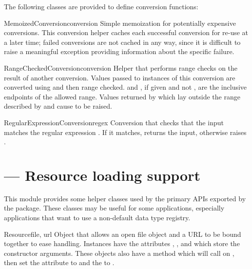 \documentclass{howto}
\begin{document}
The following classes are provided to define conversion functions:

\begin{classdesc}{MemoizedConversion}{conversion}
  Simple memoization for potentially expensive conversions.  This
  conversion helper caches each successful conversion for re-use at a
  later time; failed conversions are not cached in any way, since it
  is difficult to raise a meaningful exception providing information
  about the specific failure.
\end{classdesc}

\begin{classdesc}{RangeCheckedConversion}{conversion}
  Helper that performs range checks on the result of another
  conversion.  Values passed to instances of this conversion are
  converted using  and then range checked.  
  and , if given and not , are the inclusive
  endpoints of the allowed range.  Values returned by 
  which lay outside the range described by  and 
  cause  to be raised.
\end{classdesc}

\begin{classdesc}{RegularExpressionConversion}{regex}
  Conversion that checks that the input matches the regular expression
  .  If it matches, returns the input, otherwise raises
  .
\end{classdesc}


\section{ --- Resource loading support}


This module provides some helper classes used by the primary APIs
exported by the  package.  These classes may be useful
for some applications, especially applications that want to use a
non-default data type registry.

\begin{classdesc}{Resource}{file, url}
  Object that allows an open file object and a URL to be bound
  together to ease handling.  Instances have the attributes
  , , and  which store the
  constructor arguments.  These objects also have a 
  method which will call  on , then set the
   attribute to  and the  to
  .
\end{classdesc}
\end{document}
